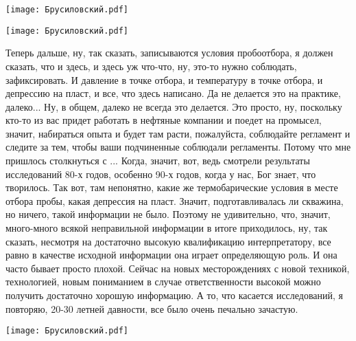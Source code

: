 \documentclass[main.tex]{subfiles}
\begin{document}
\begin{center}
\texttt{[image: Брусиловский.pdf]}
\end{center}



\begin{center}
\texttt{[image: Брусиловский.pdf]}
\end{center}

Теперь дальше, ну, так сказать, записываются условия пробоотбора, я должен сказать, что и здесь, и здесь уж что-что, ну, это-то нужно соблюдать, зафиксировать.
И давление в точке отбора, и температуру в точке отбора, и депрессию на пласт, и все, что здесь написано.
Да не делается это на практике, далеко...
Ну, в общем, далеко не всегда это делается.
Это просто, ну, поскольку кто-то из вас придет работать в нефтяные компании и поедет на промысел, значит, набираться опыта и будет там расти, пожалуйста, соблюдайте регламент и следите за тем, чтобы ваши подчиненные соблюдали регламенты.
Потому что мне пришлось столкнуться с ...
Когда, значит, вот, ведь смотрели результаты исследований 80-х годов, особенно 90-х годов, когда у нас, Бог знает, что творилось.
Так вот, там непонятно, какие же термобарические условия в месте отбора пробы, какая депрессия на пласт.
Значит, подготавливалась ли скважина, но ничего, такой информации не было.
Поэтому не удивительно, что, значит, много-много всякой неправильной информации в итоге приходилось, ну, так сказать, несмотря на достаточно высокую квалификацию интерпретатору, все равно в качестве исходной информации она играет определяющую роль.
И она часто бывает просто плохой.
Сейчас на новых месторождениях с новой техникой, технологией, новым пониманием в случае ответственности высокой можно получить достаточно хорошую информацию.
А то, что касается исследований, я повторяю, 20-30 летней давности, все было очень печально зачастую.

\begin{center}
\texttt{[image: Брусиловский.pdf]}
\end{center}
\end{document}
